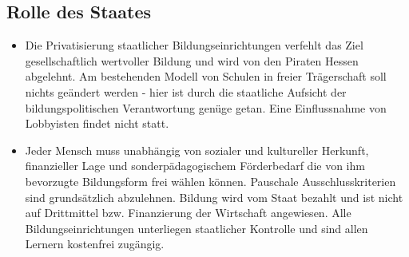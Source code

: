 \documentclass[10pt,a4paper,twocolumn,twoside,titlepage]{article}
\begin{document}
\subsection{Rolle des Staates}
\begin{itemize}
\item Die Privatisierung staatlicher Bildungseinrichtungen verfehlt das Ziel gesellschaftlich wertvoller Bildung und wird von den Piraten Hessen abgelehnt. Am bestehenden Modell von Schulen in freier Trägerschaft soll nichts geändert werden - hier ist durch die staatliche Aufsicht der bildungspolitischen Verantwortung genüge getan. Eine Einflussnahme von Lobbyisten findet nicht statt.
\item Jeder Mensch muss unabhängig von sozialer und kultureller Herkunft, finanzieller Lage und sonderpädagogischem Förderbedarf die von ihm bevorzugte Bildungsform frei wählen können. Pauschale Ausschlusskriterien sind grundsätzlich abzulehnen.
Bildung wird vom Staat bezahlt und ist nicht auf Drittmittel bzw. Finanzierung der Wirtschaft angewiesen. Alle Bildungseinrichtungen unterliegen staatlicher Kontrolle und sind allen Lernern kostenfrei zugängig.
\end{itemize}
\end{document}
